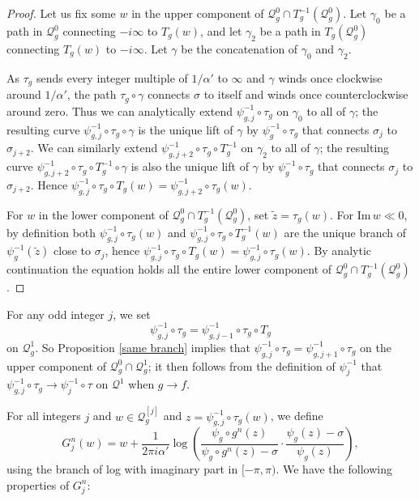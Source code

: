 \documentclass[12pt,letterpaper]{amsart}
\numberwithin{equation}{section}
\theoremstyle{remark}
\theoremstyle{definition}
\newcommand{\QQ}{\mathcal Q}
\begin{document}
	
	\begin{proof}
		Let us fix some $w$ in the upper component of $\QQ_g^0\cap T_g^{-1}(\QQ_g^0)$. Let $\gamma_{0}$ be a path in $\QQ_g^0$ connecting $-i\infty$ to $T_g(w)$, and let $\gamma_2$ be a path in $T_g(\QQ_g^0)$ connecting $T_g(w)$ to $-i\infty$. Let $\gamma$ be the concatenation of $\gamma_0$ and $\gamma_2$. 
		
		As $\tau_g$ sends every integer multiple of $1/\alpha'$ to $\infty$ and $\gamma$ winds once clockwise around $1/\alpha'$, the path $\tau_g\circ \gamma$ connects $\sigma$ to itself and winds once counterclockwise around zero. 
		Thus we can analytically extend $\psi_{g, j}^{-1}\circ \tau_g$ on $\gamma_0$ to all of $\gamma$; the resulting curve $\psi_{g, j}^{-1}\circ \tau_g\circ \gamma$ is the unique lift of $\gamma$ by $\psi_g^{-1}\circ \tau_g$ that connects $\sigma_j$ to $\sigma_{j+2}$. We can similarly extend 
		$\psi_{g, j+2}^{-1}\circ \tau_g\circ T_g^{-1}$ 
		on $\gamma_2$ to all of $\gamma$; the resulting curve  $\psi_{g, j+2}^{-1}\circ \tau_g\circ T_g^{-1}\circ \gamma$ 
		is also the unique lift of $\gamma$ by $\psi_g^{-1}\circ \tau_g$ that connects $\sigma_j$ to $\sigma_{j+2}$. 
		Hence $\psi_{g, j}^{-1}\circ \tau_g\circ T_g(w) = \psi_{g, j+2}^{-1}\circ \tau_g(w)$. 
		
		For $w$ in the lower component of $\QQ_g^0\cap T_g^{-1}(\QQ_g^0)$,
		set $\tilde{z} = \tau_g(w)$.
		For 
		 $\text{Im}\,w\ll 0$, 
		 by definition both $\psi_{g, j}^{-1}\circ \tau_g(w)$ and $\psi_{g, j}^{-1}\circ \tau_g\circ T_g^{-1}(w)$  are the unique branch of 
		 $\psi_g^{-1}(\tilde{z})$ close to $\sigma_j$, hence $\psi_{g, j}^{-1}\circ \tau_g\circ T_g(w)=\psi_{g, j}^{-1}\circ \tau_g(w)$. By analytic continuation the equation holds all the entire lower component of $\QQ_g^0\cap T_g^{-1}(\QQ_g^0)$.
	\end{proof}
	
	For any odd integer $j$, we set $$\psi_{g, j}^{-1}\circ \tau_g= \psi_{g, j-1}^{-1}\circ \tau_g\circ T_g$$ on $\QQ_g^1$. 
	So Proposition \ref{same branch} implies that $\psi_{g, j}^{-1}\circ \tau_g= \psi_{g, j+1}^{-1}\circ \tau_g$ on the upper component of $\QQ_g^0\cap \QQ_g^1$; it then follows from the definition of $\psi_{j}^{-1}$ that 
	$\psi_{g, j}^{-1}\circ \tau_g\to \psi_j^{-1}\circ \tau$ on $\QQ^1$ when $g\to f$.
	
	
	For all integers $j$ and $w\in \QQ_g^{[j]}$ and $z = \psi_{g, j}^{-1}\circ \tau_g(w)$, we define
	$${G}^n_j(w) = w+\frac{1}{2\pi i \alpha'}\log\left(\frac{\psi_g\circ g^n(z)}{\psi_g\circ g^n(z)- \sigma}\cdot \frac{\psi_g(z)-\sigma}{\psi_g(z)}\right),$$
	 using the branch of log with imaginary part in $[-\pi, \pi).$
	 We have the following properties of $G_j^n$:
	
\end{document}
